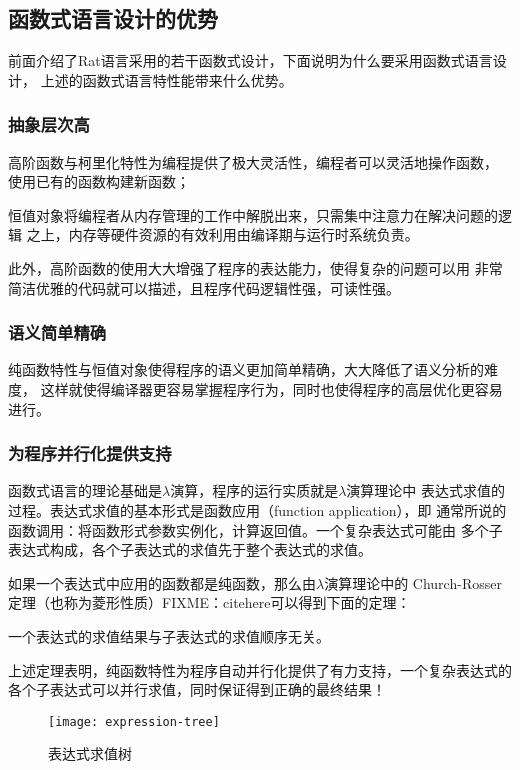 \subsection{函数式语言设计的优势}\label{subsec:functional-advantages}
前面介绍了Rat语言采用的若干函数式设计，下面说明为什么要采用函数式语言设计，
上述的函数式语言特性能带来什么优势。

\subsubsection{抽象层次高}
高阶函数与柯里化特性为编程提供了极大灵活性，编程者可以灵活地操作函数，
使用已有的函数构建新函数；

恒值对象将编程者从内存管理的工作中解脱出来，只需集中注意力在解决问题的逻辑
之上，内存等硬件资源的有效利用由编译期与运行时系统负责。

此外，高阶函数的使用大大增强了程序的表达能力，使得复杂的问题可以用
非常简洁优雅的代码就可以描述，且程序代码逻辑性强，可读性强。

\subsubsection{语义简单精确}
纯函数特性与恒值对象使得程序的语义更加简单精确，大大降低了语义分析的难度，
这样就使得编译器更容易掌握程序行为，同时也使得程序的高层优化更容易进行。

\subsubsection{为程序并行化提供支持}
函数式语言的理论基础是$\lambda$演算，程序的运行实质就是$\lambda$演算理论中
表达式求值的过程。表达式求值的基本形式是函数应用（function application），即
通常所说的函数调用：将函数形式参数实例化，计算返回值。一个复杂表达式可能由
多个子表达式构成，各个子表达式的求值先于整个表达式的求值。

如果一个表达式中应用的函数都是纯函数，那么由$\lambda$演算理论中的
Church-Rosser定理（也称为菱形性质）FIXME：citehere可以得到下面的定理：
\begin{theorem}
  一个表达式的求值结果与子表达式的求值顺序无关。
\end{theorem}

上述定理表明，纯函数特性为程序自动并行化提供了有力支持，一个复杂表达式的
各个子表达式可以并行求值，同时保证得到正确的最终结果！

\begin{quotation}
\end{quotation}
\begin{figure}
  \centering
  \texttt{[image: expression-tree]}
  \caption{表达式求值树}
  \label{fig:expression-tree}
\end{figure}

